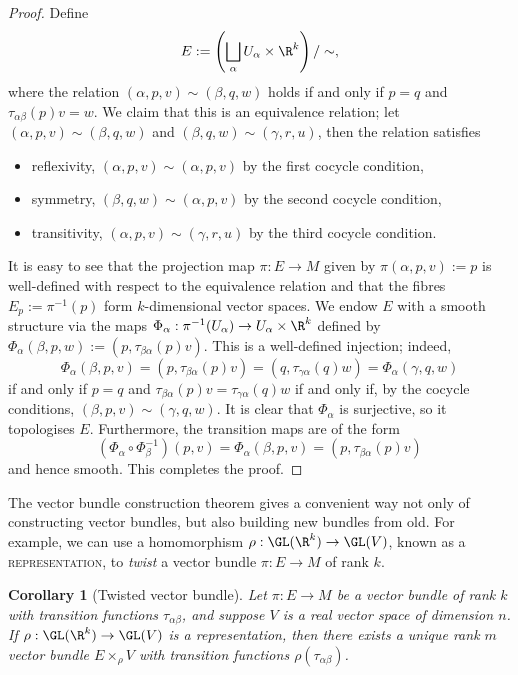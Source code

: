 \documentclass[reqno]{amsart}
\newtheorem{corollary}[theorem]{Corollary}
\theoremstyle{definition}
\theoremstyle{remark}
\renewcommand{\emph}{\textsc}
\begin{document}
\begin{proof}
	Define
		\[ E :=\left( \bigsqcup_{\alpha} U_\alpha \times \R^k \right) / \sim,  \]
	where the relation $(\alpha, p, v) \sim (\beta, q, w)$ holds if and only if $p = q$ and $\tau_{\alpha \beta} (p) v = w$. We claim that this is an equivalence relation; let $(\alpha, p, v) \sim (\beta, q, w)$ and $(\beta, q, w) \sim (\gamma, r, u)$, then the relation satisfies
	\begin{itemize}
		\item reflexivity, $(\alpha, p, v) \sim (\alpha, p, v)$ by the first cocycle condition, 
		
		\item symmetry, $(\beta, q, w) \sim (\alpha, p, v)$ by the second cocycle condition, 
		
		\item transitivity, $(\alpha, p, v) \sim (\gamma, r, u)$ by the third cocycle condition. 
	\end{itemize}
	It is easy to see that the projection map $\pi : E \to M$ given by $\pi(\alpha, p, v) := p$ is well-defined with respect to the equivalence relation and that the fibres $E_p := \pi^{-1} (p)$ form $k$-dimensional vector spaces. We endow $E$ with a smooth structure via the maps $\Phi_\alpha : \pi^{-1} (U_\alpha) \to U_\alpha \times \R^k$ defined by $\Phi_\alpha (\beta, p, w) := (p, \tau_{\beta \alpha} (p) v)$. This is a well-defined injection; indeed, 
		\[ \Phi_\alpha (\beta, p, v) = (p, \tau_{\beta \alpha}(p) v) = (q, \tau_{\gamma \alpha} (q) w) = \Phi_\alpha (\gamma, q, w) \]	
	if and only if $p = q$ and $\tau_{\beta \alpha} (p) v = \tau_{\gamma \alpha} (q) w$ if and only if, by the cocycle conditions, $(\beta, p, v) \sim (\gamma, q, w)$. It is clear that $\Phi_\alpha$ is surjective, so it topologises $E$. Furthermore, the transition maps are of the form
		\[ (\Phi_\alpha \circ \Phi_\beta^{-1})(p, v) = \Phi_\alpha (\beta, p, v) = (p, \tau_{\beta \alpha} (p) v) \]
	and hence smooth. This completes the proof. 
\end{proof}

The vector bundle construction theorem gives a convenient way not only of constructing vector bundles, but also building new bundles from old. For example, we can use a homomorphism $\rho : \GL (\R^k) \to \GL (V)$, known as a \emph{representation}, to \textit{twist} a vector bundle $\pi : E \to M$ of rank $k$.

\begin{corollary}[Twisted vector bundle]
	Let $\pi : E \to M$ be a vector bundle of rank $k$ with transition functions $\tau_{\alpha \beta}$, and suppose $V$ is a real vector space of dimension $n$. If $\rho : \GL (\R^k) \to \GL (V)$ is a representation, then there exists a unique rank $m$ vector bundle $E \times_\rho V$ with transition functions $\rho (\tau_{\alpha \beta})$. 
\end{corollary}
\end{document}
